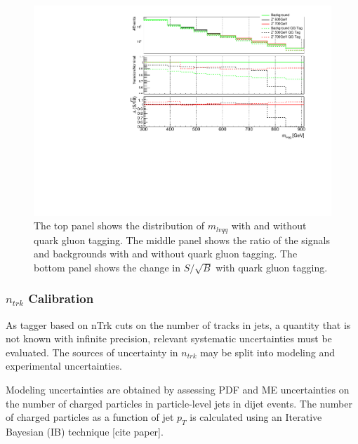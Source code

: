 \begin{figure}[h!]
  \centering
  \includegraphics[width=\hsize]{figures/QGT/s_root_b_recotag.pdf}
  \caption{The top panel shows the distribution of $m_{lvqq}$ with and without quark gluon tagging. The middle panel shows the ratio of the signals and backgrounds with and without quark gluon tagging. The bottom panel shows the change in $S/\sqrt{B}$ with quark gluon tagging.}
  \label{fig:qg_s_root_b}
\end{figure}
\FloatBarrier


\pagebreak
\pagebreak
\pagebreak
\subsubsection{$n_{trk}$ Calibration}
As tagger based on nTrk cuts on the number of tracks in jets, a quantity that is not known with infinite precision, relevant systematic uncertainties must be evaluated. The sources of uncertainty in $n_{trk}$ may be split into modeling and experimental uncertainties. 

Modeling uncertainties are obtained by assessing PDF and ME uncertainties on the number of charged particles in particle-level jets in dijet events. The number of charged particles as a function of jet $p_{T}$  is calculated using an Iterative Bayesian (IB) technique [cite paper].

